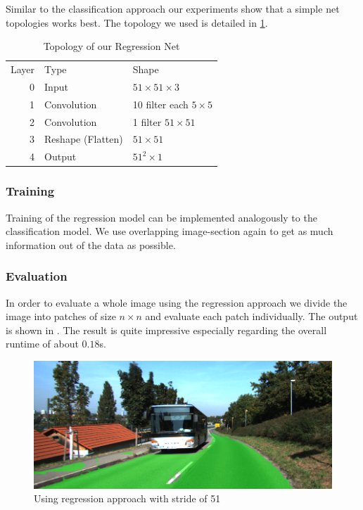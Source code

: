 Similar to the classification approach our experiments show that a simple net topologies works best. The topology we used is detailed in \cref{tab:topo2}.

\begin{table}[H]
	\normalsize
	\centering
	\begin{tabular}{r l l}
		Layer & Type  & Shape  \\
		0     & Input &  $51 \times 51 \times 3$ \\
		1     & Convolution & 10 filter  each $5 \times 5$ \\
		2     & Convolution & 1 filter $51 \times 51$  \\
		3     & Reshape (Flatten) & $51 \times 51$ \\
		4     & Output     & $51^2 \times 1$ \\
	\end{tabular}
	\caption{Topology of our Regression Net}
	\label{tab:topo2}
\end{table} 

\subsubsection{Training}

Training of the regression model can be implemented analogously to the classification model. We use overlapping image-section again to get as much information out of the data as possible.

\subsubsection{Evaluation}

In order to evaluate a whole image using the regression approach we divide the image into patches of size $n \times n$ and evaluate each patch individually. The output is shown in . The result is quite impressive especially regarding the overall runtime of about $0.18$s. 

\begin{figure}[]
	\centering
	\includegraphics[width=\columnwidth]{figures/models/testing2-um_32_conv_stride51.png}
	\caption{Using regression approach with stride of 51}
	\label{fig:reg_stride2}
\end{figure} 


